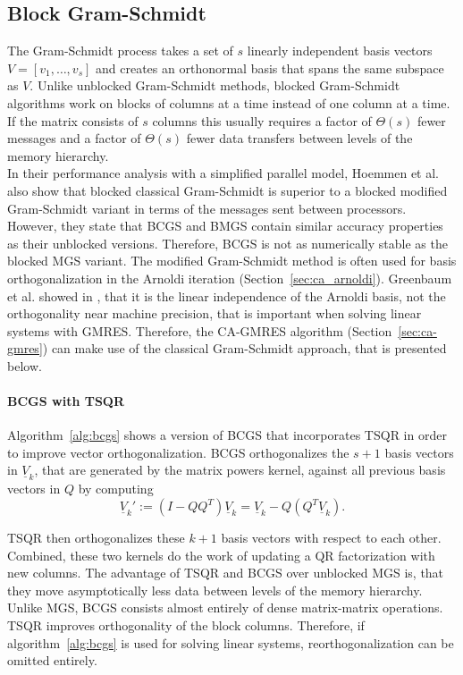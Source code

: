 \documentclass{scrartcl}
\numberwithin{equation}{section}
\begin{document}
\subsection{Block Gram-Schmidt} \label{sec:gs}
The Gram-Schmidt process takes a set of $s$ linearly independent basis vectors $V = [v_1, \ldots, v_s]$ and creates an orthonormal basis that spans the same subspace as $V$. Unlike unblocked Gram-Schmidt methods, blocked Gram-Schmidt algorithms work on blocks of columns at a time instead of one column at a time. If the matrix consists of $s$ columns this usually requires a factor of $\Theta (s)$ fewer messages and a factor of $\Theta(s)$ fewer data transfers between levels of the memory hierarchy.\\
In their performance analysis with a simplified parallel model, Hoemmen et al. \cite{Hoemmen:2010:CKS:1970638} also show that blocked classical Gram-Schmidt is superior to a blocked modified Gram-Schmidt variant in terms of the messages sent between processors. However, they state that BCGS and BMGS contain similar accuracy properties as their unblocked versions. Therefore, BCGS is not as numerically stable as the blocked MGS variant. The modified Gram-Schmidt method is often used for basis orthogonalization in the Arnoldi iteration (Section~\ref{sec:ca_arnoldi}). Greenbaum et al. showed in \cite{Greenbaum97numericalbehaviour}, that it is the linear independence of the Arnoldi basis, not the orthogonality near machine precision, that is important when solving linear systems with GMRES. Therefore, the CA-GMRES algorithm (Section~\ref{sec:ca-gmres}) can make use of the classical Gram-Schmidt approach, that is presented below.

\paragraph{BCGS with TSQR} Algorithm~\ref{alg:bcgs} shows a version of BCGS that incorporates TSQR in order to improve vector orthogonalization. BCGS orthogonalizes the $s + 1$ basis vectors in $\underline{V}_k$, that are generated by the matrix powers kernel, against all previous basis vectors in $Q$ by computing
\begin{equation}
	\underline{V}_k' := (I - QQ^T)\underline{V}_k = \underline{V}_k - Q(Q^T\underline{V}_k).
\end{equation}

TSQR then orthogonalizes these $k + 1$ basis vectors with respect to each other. Combined, these two kernels do the work of updating a QR factorization with new columns. The advantage of TSQR and BCGS over unblocked MGS is, that they move asymptotically less data between levels of the memory hierarchy. Unlike MGS, BCGS consists almost entirely of dense matrix-matrix operations. TSQR improves orthogonality of the block columns. Therefore, if algorithm~\ref{alg:bcgs} is used for solving linear systems, reorthogonalization can be omitted entirely.
\end{document}
